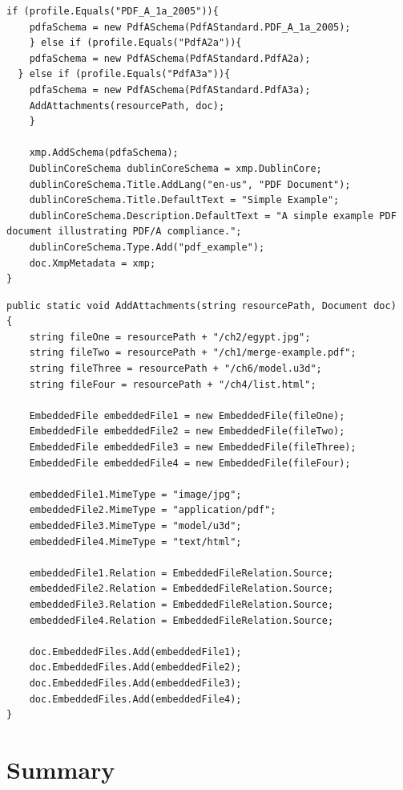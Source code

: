 \documentclass[american]{tufte-book}
\numberwithin{equation}{section}
\numberwithin{figure}{section}
\begin{document}
{{\begin{lstlisting}[caption={Creating a PDF/A-3a compliant PDF document.},label={lis:Creating-a-PDF/A-3a},basicstyle={\footnotesize\ttfamily},breaklines=true]
    if (profile.Equals("PDF_A_1a_2005")){
    pdfaSchema = new PdfASchema(PdfAStandard.PDF_A_1a_2005);
    } else if (profile.Equals("PdfA2a")){
    pdfaSchema = new PdfASchema(PdfAStandard.PdfA2a);
  } else if (profile.Equals("PdfA3a")){
    pdfaSchema = new PdfASchema(PdfAStandard.PdfA3a);
    AddAttachments(resourcePath, doc);
    }

    xmp.AddSchema(pdfaSchema);
    DublinCoreSchema dublinCoreSchema = xmp.DublinCore;
    dublinCoreSchema.Title.AddLang("en-us", "PDF Document");
    dublinCoreSchema.Title.DefaultText = "Simple Example";
    dublinCoreSchema.Description.DefaultText = "A simple example PDF document illustrating PDF/A compliance.";
    dublinCoreSchema.Type.Add("pdf_example");
    doc.XmpMetadata = xmp;
}
\end{lstlisting}
\leavevmode\egroup

\bgroup{}
\begin{lstlisting}[caption={Adding attachments to PDF/A-3a compliant PDF Document.},label={lis:Adding-attachments-to},basicstyle={\footnotesize\ttfamily},breaklines=true]
public static void AddAttachments(string resourcePath, Document doc)
{
    string fileOne = resourcePath + "/ch2/egypt.jpg";
    string fileTwo = resourcePath + "/ch1/merge-example.pdf";
    string fileThree = resourcePath + "/ch6/model.u3d";
    string fileFour = resourcePath + "/ch4/list.html";

    EmbeddedFile embeddedFile1 = new EmbeddedFile(fileOne);
    EmbeddedFile embeddedFile2 = new EmbeddedFile(fileTwo);
    EmbeddedFile embeddedFile3 = new EmbeddedFile(fileThree);
    EmbeddedFile embeddedFile4 = new EmbeddedFile(fileFour);

    embeddedFile1.MimeType = "image/jpg";
    embeddedFile2.MimeType = "application/pdf";
    embeddedFile3.MimeType = "model/u3d";
    embeddedFile4.MimeType = "text/html";

    embeddedFile1.Relation = EmbeddedFileRelation.Source;
    embeddedFile2.Relation = EmbeddedFileRelation.Source;
    embeddedFile3.Relation = EmbeddedFileRelation.Source;
    embeddedFile4.Relation = EmbeddedFileRelation.Source;

    doc.EmbeddedFiles.Add(embeddedFile1);
    doc.EmbeddedFiles.Add(embeddedFile2);
    doc.EmbeddedFiles.Add(embeddedFile3);
    doc.EmbeddedFiles.Add(embeddedFile4);
}
\end{lstlisting}
\leavevmode\egroup


\section{Summary}

}}
\end{document}

